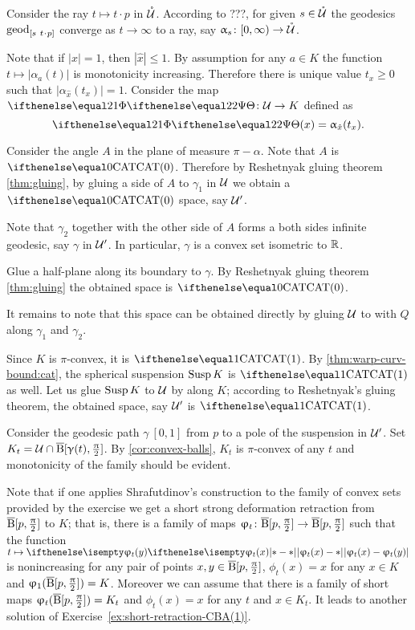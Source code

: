 Consider the ray $t\mapsto t\cdot p$ in  $\mathring{\mathcal{U}}$.
According to ???, %
for given $s\in \mathring{\spc{U}}$
the geodesics $\geod_{[s\ t\cdot p]}$ converge as $t\to\infty$ to a ray, 
say $\alpha_s\:[0,\infty)\to \mathring{\spc{U}}$.



Note that if $|x|=1$, then $|\hat x|\le 1$.
By assumption for any $a\in K$ the function $t\mapsto |\alpha_a(t)|$ is monotonicity increasing.
Therefore there is unique value $t_x\ge 0$ such that
$|\alpha_{\hat x}(t_x)|=1$.
Consider the map $\map[2]\:\spc{U}\to K$
defined as 
\[\map[2](x)=\alpha_{\hat x}(t_x).\]

Consider the angle $A$ in the plane of measure $\pi-\alpha$.
Note that $A$ is $\CAT0$.
Therefore by Reshetnyak gluing theorem \ref{thm:gluing},
by gluing a side of $A$ to $\gamma_1$ in $\mathcal{U}$ we obtain a $\CAT0$ space, say $\mathcal{U}'$.

Note that $\gamma_2$ together with the other side of $A$ forms a both sides infinite geodesic, say $\gamma$ in $\mathcal{U}'$.
In particular, $\gamma$ is a convex set isometric to $\mathbb{R}$.

Glue a half-plane along its boundary to $\gamma$.
By Reshetnyak gluing theorem \ref{thm:gluing} the obtained space is $\CAT0$.

It remains to note that this space can be obtained directly by gluing $\mathcal{U}$ to with $Q$ along $\gamma_1$ and $\gamma_2$.

Since $K$ is $\pi$-convex, it is $\CAT1$.
By \ref{thm:warp-curv-bound:cat}, the spherical suspension $\mathop{\rm Susp}\nolimits K$ is $\CAT1$ as well.
Let us glue $\mathop{\rm Susp}\nolimits K$ to $\mathcal{U}$ by along $K$;
according to Reshetnyak's gluing theorem, the obtained space, say $\mathcal{U}'$ is $\CAT1$.

Consider the geodesic path $\gamma\:[0,1]$ from $p$ to a pole of the suspension in $\mathcal{U}'$.
Set $K_t=\spc{U}\cap\cBall[\gamma(t),\tfrac\pi2]$.
By \ref{cor:convex-balls}, $K_t$ is $\pi$-convex of any $t$ and monotonicity of the family should be evident.

Note that if one applies Shrafutdinov's construction to the family of convex sets provided by the exercise we get a short strong deformation retraction from $\overline{\mathrm{B}}{}[p,\tfrac{\uppi}2]$ to $K$;
that is, there is a family of maps $\phi_t\:\cBall[p,\tfrac\pi2]\to \cBall[p,\tfrac\pi2]$ such that 
the function $t\mapsto \dist{\phi_t(x)}{\phi_t(y)}{}$ is nonincreasing for any pair of points $x,y\in\cBall[p,\tfrac\pi2]$, $\phi_t(x)=x$ for any $x\in K$ and $\upvarphi_1(\overline{\mathrm{B}}{}[p,\tfrac{\uppi}2])=K$. 
Moreover we can assume that there is a family of short maps $\upvarphi_t(\overline{\mathrm{B}}{}[p,\tfrac{\uppi}2])= K_t$ and $\phi_t(x)=x$ for any $t$ and $x\in K_t$.
It leads to another solution of Exercise~\ref{ex:short-retraction-CBA(1)}.


